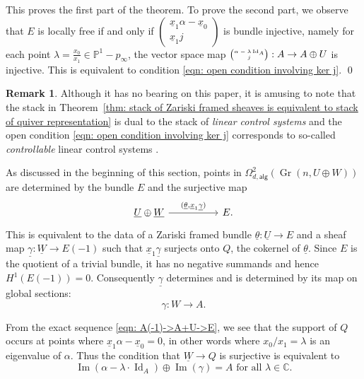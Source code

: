 \documentclass{amsart}
\theoremstyle{definition}
\newtheorem{remark}[theorem]{Remark}
\newcommand{\CC} {{\mathbb C}}          %
\newcommand{\PP}{\mathbb{P}}
\newcommand{\im}{\operatorname{Im}}
\newcommand{\UL}[1]{\underline{#1}}
\newcommand{\alg}{\mathsf{alg}}
\newcommand{\Gr}{\operatorname{Gr}}
\newcommand{\LoopTwo}{\Omega^{2}_{d,\alg}}
\newcommand{\Id}{\operatorname{Id}}
\begin{document}
This proves the first part of the theorem. To prove the second part,
we observe that  $E$ is locally free if and only if
$ \left(\begin{smallmatrix} \UL{x}_{1} \alpha -\UL{x}_{0}\\ 
\UL{x}_{1}j \end{smallmatrix} \right)$ is bundle injective, namely for
each point $\lambda =\frac{x_{0}}{x_{1}}\in \PP^{1}-p_{\infty}$,
the vector space map ${\tiny \begin{pmatrix} \alpha -\lambda \Id_{A}\\
j \end{pmatrix}} : A\to A\oplus U $ is injective. This is equivalent
to condition \eqref{eqn: open condition involving ker j}.
\qed 

\begin{remark}\label{rem: linear control systems}
Although it has no bearing on this paper, it is amusing to note that
the stack in Theorem~\ref{thm: stack of Zariski framed sheaves is
equivalent to stack of quiver representation} is dual to the stack of
\emph{linear control systems} and the open condition \eqref{eqn: open
condition involving ker j} corresponds to so-called
\emph{controllable} linear control systems
\cite{Geiss-intro-to-moduli-quivers}.
\end{remark}


As discussed in the beginning of this section, points in $\LoopTwo
(\Gr (n,U\oplus W))$ are determined by the bundle $E$ and the
surjective map
\[
\begin{tikzcd}[column sep={8em,between origins}]
\UL{U}\oplus \UL{W} \arrow{r}{(\UL{\theta },\UL{x}_{1}\UL{\gamma})} &E .
\end{tikzcd}
\]
This is equivalent to the data of a Zariski framed bundle
$\UL{\theta}:\UL{U}\to E$ and a sheaf map $\UL{\gamma}:\UL{W}\to
E(-1)$ such that $\UL{x}_{1}\UL{\gamma}$ surjects onto $Q$, the
cokernel of $\UL{\theta}$. Since $E$ is the quotient of a trivial
bundle, it has no negative summands and hence
$H^{1}(E(-1))=0$. Consequently $\UL{\gamma}$ determines and is
determined by its map on global sections:
\[
\gamma :W \to A.
\]

From the exact sequence \eqref{eqn: A(-1)->A+U->E}, we see that the
support of $Q$ occurs at points where $\UL{x}_{1}\alpha
-\UL{x}_{0}=0$, in other words where $x_{0}/x_{1}=\lambda $ is an
eigenvalue of $\alpha$. Thus the condition that $\UL{W}\to Q$ is
surjective is equivalent to
\begin{equation}\label{eqn: open condition with gamma}
\im (\alpha -\lambda \cdot \Id_{A})\oplus \im (\gamma )=A \text{ for
all }\lambda\in \CC.
\end{equation}
\end{document}
